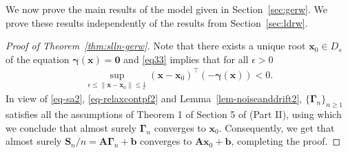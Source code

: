 \documentclass[12pt]{amsart}
\theoremstyle{plain}
\theoremstyle{remark}
\numberwithin{equation}{section}
\begin{document}
We now prove the main results of the model given in Section~\ref{sec:gerw}. We prove these results independently of the results from Section~\ref{sec:ldrw}.

\begin{proof}[Proof of Theorem~\ref{thm:slln-gerw}]
Note that there exists a unique root $\boldsymbol{x}_0 \in {D}_s$ of the equation $\boldsymbol{\gamma}(\boldsymbol{x}) = \boldsymbol{0}$ and \eqref{eq33} implies that for all 
$\epsilon > 0$ 
\begin{align}\label{eq-relaxcontpf2}
     \sup_{\epsilon \leq \|\boldsymbol{x} - \boldsymbol{x}_0\| \leq \frac{1}{\epsilon}}  \left(\boldsymbol{x} - \boldsymbol{x}_0\right)^{\top}\left(-\boldsymbol{\gamma}(\boldsymbol{x})\right) < 0.
\end{align}
In view of \eqref{eq-sa2}, \eqref{eq-relaxcontpf2} and Lemma~\ref{lem-noiseanddrift2}, $\{\boldsymbol{\Gamma}_n\}_{n \geq 1}$ satisfies all the assumptions of Theorem 1 of Section 5 of \cite{MR1082341} (Part II), using which we conclude that almost surely $\boldsymbol{\Gamma}_{n}$ converges to $\boldsymbol{x}_0$. Consequently, we get that almost surely ${\boldsymbol{S}_n}/{n} = \boldsymbol{A}\boldsymbol{\Gamma}_{n} + \boldsymbol{b}$ converges to $\boldsymbol{A}\boldsymbol{x}_0 + \boldsymbol{b}$, completing the proof.
\end{proof}
\end{document}
